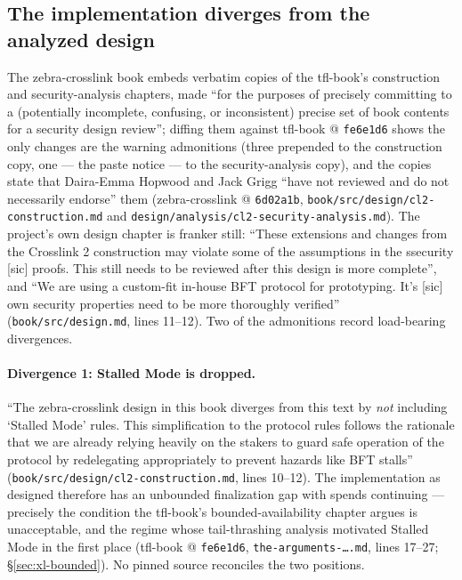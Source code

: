 \documentclass[11pt,a4paper]{article}
\theoremstyle{definition}
\begin{document}
\subsection{The implementation diverges from the analyzed design}
\label{sec:xl-impl-divergences}

The zebra-crosslink book embeds verbatim copies of the tfl-book's
construction and security-analysis chapters, made ``for the purposes of
precisely committing to a (potentially incomplete, confusing, or
inconsistent) precise set of book contents for a security design
review''; diffing them against tfl-book @ \texttt{fe6e1d6} shows the only
changes are the warning admonitions (three prepended to the construction
copy, one --- the paste notice --- to the security-analysis copy), and the
copies state that
Daira-Emma Hopwood and Jack Grigg ``have not reviewed and do not
necessarily endorse'' them (zebra-crosslink @ \texttt{6d02a1b},
\texttt{book/src/design/cl2-construction.md} and
\texttt{design/analysis/cl2-security-analysis.md}). The project's own
design chapter is franker still: ``These extensions and changes from the
Crosslink 2 construction may violate some of the assumptions in the
ssecurity [sic] proofs. This still needs to be reviewed after this design
is more complete'', and ``We are using a custom-fit in-house BFT protocol
for prototyping. It's [sic] own security properties need to be more
thoroughly verified'' (\texttt{book/src/design.md}, lines 11--12). Two of
the
admonitions record load-bearing divergences.

\paragraph{Divergence 1: Stalled Mode is dropped.} ``The zebra-crosslink
design in this book diverges from this text by \emph{not} including
`Stalled Mode' rules. This simplification to the protocol rules follows
the rationale that we are already relying heavily on the stakers to guard
safe operation of the protocol by redelegating appropriately to prevent
hazards like BFT stalls'' (\texttt{book/src/design/cl2-construction.md},
lines 10--12). The implementation as designed therefore has an unbounded
finalization gap with spends continuing --- precisely the condition the
tfl-book's bounded-availability chapter argues is unacceptable, and the
regime whose tail-thrashing analysis motivated Stalled Mode in the first
place (tfl-book @ \texttt{fe6e1d6}, \texttt{the-arguments-\ldots.md},
lines 17--27; \S\ref{sec:xl-bounded}). No pinned source reconciles the two
positions.
\end{document}
